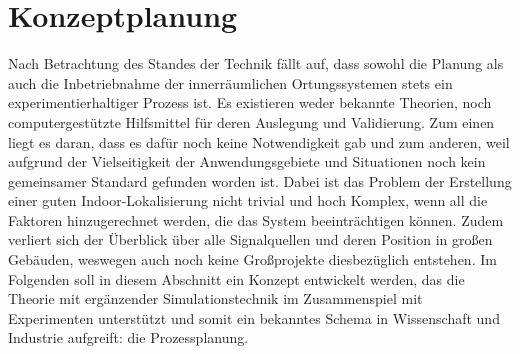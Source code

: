 \chapter{Konzeptplanung}
Nach Betrachtung des Standes der Technik fällt auf, dass sowohl die Planung als auch die Inbetriebnahme der innerräumlichen Ortungssystemen stets ein experimentierhaltiger Prozess ist. Es existieren weder bekannte Theorien, noch computergestützte Hilfsmittel für deren Auslegung und Validierung. Zum einen liegt es daran, dass es dafür noch keine Notwendigkeit gab und zum anderen, weil aufgrund der Vielseitigkeit der Anwendungsgebiete und Situationen noch kein gemeinsamer Standard gefunden worden ist. Dabei ist das Problem der Erstellung einer guten Indoor-Lokalisierung nicht trivial und hoch Komplex, wenn all die Faktoren hinzugerechnet werden, die das System beeinträchtigen können. Zudem verliert sich der Überblick über alle Signalquellen und deren Position in großen Gebäuden, weswegen auch noch keine Großprojekte diesbezüglich entstehen. Im Folgenden soll in diesem Abschnitt ein Konzept entwickelt werden, das die Theorie mit ergänzender Simulationstechnik im Zusammenspiel mit Experimenten unterstützt und somit ein bekanntes Schema in Wissenschaft und Industrie aufgreift: die Prozessplanung.
